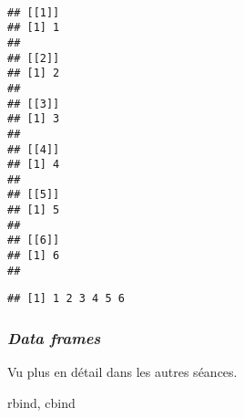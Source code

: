 \begin{knitrout}
\color{fgcolor}\begin{kframe}
\begin{flushleft}
\ttfamily\noindent
{}\hlassignement{\usebox{\hlnormalsizeboxlessthan}-}{\ }\hlkeyword{(}\hlkeyword{,}{\ }\hlkeyword{,}{\ }\hlkeyword{,}{\ }\hlkeyword{,}{\ }\hlkeyword{,}{\ }\hlkeyword{)}\hspace*{\fill}\\
\hlstd{}\mbox{}
\normalfont
\end{flushleft}
\begin{verbatim}
## [[1]]
## [1] 1
## 
## [[2]]
## [1] 2
## 
## [[3]]
## [1] 3
## 
## [[4]]
## [1] 4
## 
## [[5]]
## [1] 5
## 
## [[6]]
## [1] 6
## 
\end{verbatim}
\begin{flushleft}
\ttfamily\noindent
{}\hlkeyword{(}\hlkeyword{)}\mbox{}
\normalfont
\end{flushleft}
\begin{verbatim}
## [1] 1 2 3 4 5 6
\end{verbatim}
\end{kframe}
\end{knitrout}


\subsubsection{\emph{Data frames}}

Vu plus en détail dans les autres séances.

rbind, cbind
